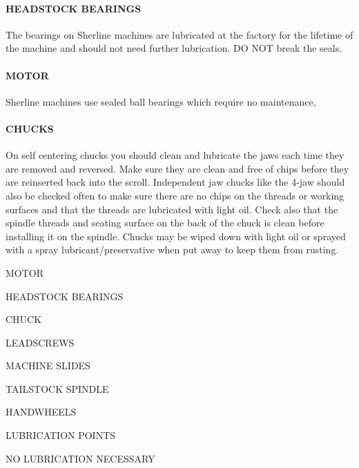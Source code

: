 \paragraph{HEADSTOCK BEARINGS} The bearings on Sherline machines are lubricated
at the factory for the lifetime of the machine and should not need further
lubrication. DO NOT break the seals.

\paragraph{MOTOR} Sherline machines use sealed ball bearings which require no
maintenance,

\paragraph{CHUCKS} On self centering chucks you should clean and lubricate the
jaws each time they are removed and reversed. Make sure they are clean and free
of chips before they are reinserted back into the scroll. Independent jaw chucks
like the 4-jaw should also be checked often to make sure there are no chips on
the threads or working surfaces and that the threads are lubricated with light
oil. Check also that the spindle threads and seating surface on the back of the
chuck is clean before installing it on the spindle. Chucks may be wiped down
with light oil or sprayed with a spray lubricant/preservative when put away to
keep them from rusting.

\bigskip
MOTOR

HEADSTOCK BEARINGS

CHUCK

LEADSCREWS

MACHINE SLIDES

TAILSTOCK SPINDLE

HANDWHEELS

LUBRICATION POINTS

NO LUBRICATION NECESSARY
\bigskip


